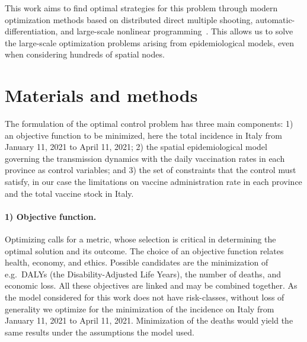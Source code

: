This work aims to find optimal strategies for this problem through modern optimization methods based on distributed direct multiple shooting, automatic-differentiation, and large-scale nonlinear programming~\cite{Bock:MultipleShootingAlgorithm:1984,Savorgnan:MultipleShootingDistributed:2011,Andersson:CasADiSoftwareFramework:2018,Wachter:ImplementationInteriorpointFilter:2006}. This allows us to solve the large-scale optimization problems arising from epidemiological models, even when considering hundreds of spatial nodes. 


\section{Materials and methods} \label{sec:matmet}

The formulation of the optimal control problem has three main components: 1) an objective function to be minimized, here the total incidence in Italy from January 11, 2021 to April 11, 2021; 2) the spatial epidemiological model\cite{Gatto:SpreadDynamicsCOVID19:2020, Bertuzzo:GeographyCOVID19Spread:2020} governing the transmission dynamics with the daily vaccination rates in each province as control variables; and 3) the set of constraints that the control must satisfy, in our case the limitations on vaccine administration rate in each province and the total vaccine stock in Italy.

\paragraph{1) Objective function.} Optimizing calls for a metric, whose selection is critical in determining the optimal solution and its outcome. The choice of an objective function relates health, economy, and ethics. Possible candidates are the minimization of e.g.~DALYs (the Disability-Adjusted Life Years), the number of deaths, and economic loss\cite{Du:ComparativeCosteffectivenessSARSCoV2:2021}. All these objectives are linked and may be combined together. As the model considered for this work does not have risk-classes, without loss of generality we optimize for the minimization of the incidence on Italy from January 11, 2021 to April 11, 2021. Minimization of the deaths would yield the same results under the assumptions the model used.

